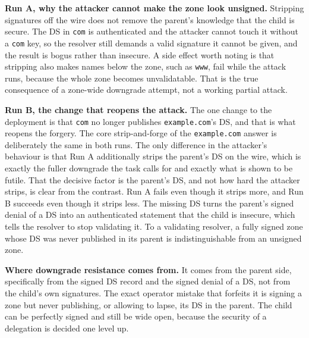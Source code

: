 \documentclass[11pt]{article}
\begin{document}
\textbf{Run A, why the attacker cannot make the zone look unsigned.} Stripping
signatures off the wire does not remove the parent's knowledge that the child is
secure. The DS in \texttt{com} is authenticated and the attacker cannot touch it
without a \texttt{com} key, so the resolver still demands a valid signature it
cannot be given, and the result is bogus rather than insecure. A side effect worth
noting is that stripping also makes names below the zone, such as \texttt{www},
fail while the attack runs, because the whole zone becomes unvalidatable. That is
the true consequence of a zone-wide downgrade attempt, not a working partial
attack.

\textbf{Run B, the change that reopens the attack.} The one change to the deployment
is that \texttt{com} no longer publishes \texttt{example.com}'s DS, and that is what
reopens the forgery. The core strip-and-forge of the \texttt{example.com} answer is
deliberately the same in both runs. The only difference in the attacker's behaviour
is that Run A additionally strips the parent's DS on the wire, which is exactly the
fuller downgrade the task calls for and exactly what is shown to be futile. That the
decisive factor is the parent's DS, and not how hard the attacker strips, is clear
from the contrast. Run A fails even though it strips more, and Run B succeeds even
though it strips less. The missing DS turns the parent's signed denial of a DS into
an authenticated statement that the child is insecure, which tells the resolver to
stop validating it. To a validating resolver, a fully signed zone whose DS was never
published in its parent is indistinguishable from an unsigned zone.

\textbf{Where downgrade resistance comes from.} It comes from the parent side,
specifically from the signed DS record and the signed denial of a DS, not from the
child's own signatures. The exact operator mistake that forfeits it is signing a
zone but never publishing, or allowing to lapse, its DS in the parent. The child
can be perfectly signed and still be wide open, because the security of a
delegation is decided one level up.

\end{document}
